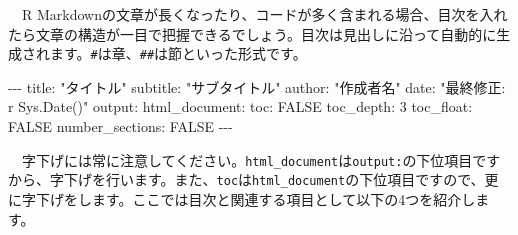 \documentclass[
  a4paper,
  pandoc,
  ja=standard,
  jafont=haranoaji]{bxjsbook}
\newenvironment{Shaded}{\begin{snugshade}}{\end{snugshade}}
\newcommand{\AttributeTok}[1]{\textcolor[rgb]{0.00,0.48,0.65}{#1}}
\newcommand{\CharTok}[1]{\textcolor[rgb]{0.13,0.47,0.30}{#1}}
\newcommand{\DecValTok}[1]{\textcolor[rgb]{0.68,0.00,0.00}{#1}}
\newcommand{\FunctionTok}[1]{\textcolor[rgb]{0.28,0.35,0.67}{#1}}
\newcommand{\KeywordTok}[1]{\textcolor[rgb]{0.00,0.48,0.65}{#1}}
\newcommand{\PreprocessorTok}[1]{\textcolor[rgb]{0.68,0.00,0.00}{#1}}
\newcommand{\StringTok}[1]{\textcolor[rgb]{0.13,0.47,0.30}{#1}}
\begin{document}
　R
Markdownの文章が長くなったり、コードが多く含まれる場合、目次を入れたら文章の構造が一目で把握できるでしょう。目次は見出しに沿って自動的に生成されます。\texttt{\#}は章、\texttt{\#\#}は節といった形式です。

\begin{Shaded}
\begin{Highlighting}[]
\PreprocessorTok{{-}{-}{-}}
\FunctionTok{title}\KeywordTok{:}\AttributeTok{ }\StringTok{"タイトル"}
\FunctionTok{subtitle}\KeywordTok{:}\AttributeTok{ }\StringTok{"サブタイトル"}
\FunctionTok{author}\KeywordTok{:}\AttributeTok{ }\StringTok{"作成者名"}
\FunctionTok{date}\KeywordTok{:}\AttributeTok{ }\StringTok{"最終修正: \textasciigrave{}r Sys.Date()\textasciigrave{}"}
\FunctionTok{output}\KeywordTok{:}
\AttributeTok{  }\FunctionTok{html\_document}\KeywordTok{:}
\AttributeTok{    }\FunctionTok{toc}\KeywordTok{:}\AttributeTok{ }\CharTok{FALSE}
\AttributeTok{    }\FunctionTok{toc\_depth}\KeywordTok{:}\AttributeTok{ }\DecValTok{3}
\AttributeTok{    }\FunctionTok{toc\_float}\KeywordTok{:}\AttributeTok{ }\CharTok{FALSE}
\AttributeTok{    }\FunctionTok{number\_sections}\KeywordTok{:}\AttributeTok{ }\CharTok{FALSE}
\PreprocessorTok{{-}{-}{-}}
\end{Highlighting}
\end{Shaded}

　字下げには常に注意してください。\texttt{html\_document}は\texttt{output:}の下位項目ですから、字下げを行います。また、\texttt{toc}は\texttt{html\_document}の下位項目ですので、更に字下げをします。ここでは目次と関連する項目として以下の4つを紹介します。
\end{document}
